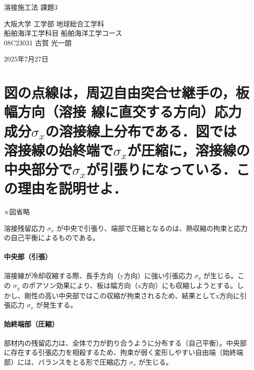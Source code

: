 \documentclass[12pt]{jarticle}
\begin{document}
\begin{center}
    {\huge 溶接施工法 課題3 \par}
    \vspace{1.5em}
    {\large 大阪大学 工学部 地球総合工学科 \\ 船舶海洋工学科目 船舶海洋工学コース \\ 08C23031 古賀 光一朗 \par}
    \vspace{1em}
    {\large 2025年7月27日\par}
\end{center}

\section*{図の点線は，周辺自由突合せ継手の，板幅方向（溶接
線に直交する方向）応力成分$\sigma_x$の溶接線上分布である．図では溶接線の始終端で$\sigma_x$が圧縮に，溶接線の中央部分で$\sigma_x$が引張りになっている．この理由を説明せよ．}

※図省略\\
\vspace{5mm}

溶接残留応力 $\sigma_x$ が中央で引張り、端部で圧縮となるのは、熱収縮の拘束と応力の自己平衡によるものである。

\paragraph{中央部（引張）}
溶接線が冷却収縮する際、長手方向（y方向）に強い引張応力 $\sigma_y$ が生じる。この $\sigma_y$ のポアソン効果により、板は幅方向（x方向）にも収縮しようとする。しかし、剛性の高い中央部ではこの収縮が拘束されるため、結果としてx方向に引張応力 $\sigma_x$ が発生する。

\paragraph{始終端部（圧縮）}
部材内の残留応力は、全体で力が釣り合うように分布する（自己平衡）。中央部に存在する引張応力を相殺するため、拘束が弱く変形しやすい自由端（始終端部）には、バランスをとる形で圧縮応力 $\sigma_x$ が生じる。
\end{document}
